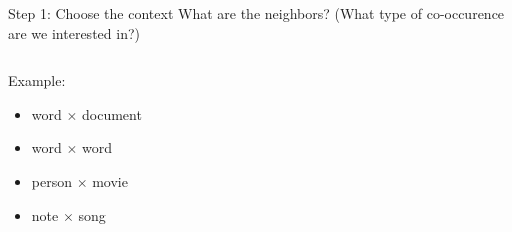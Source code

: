 \documentclass[usenames,dvipsnames,notes,11pt,aspectratio=169]{beamer}
\newcommand{\pdfnote}[1]{}
\begin{document}
\begin{frame}
    {Step 1: Choose the context}
    What are the neighbors? (What type of co-occurence are we interested in?)
    \medskip

    \begin{columns}
        \begin{column}{0.3\textwidth}
    Example:\\
    \begin{itemize}[<+->]
        \item word $\times$ document
        \item word $\times$ word
        \item person $\times$ movie
        \item note $\times$ song
    \end{itemize}
        \end{column}
        \begin{column}{0.65\textwidth}
        \end{column}
    \end{columns}

    \medskip

    \pdfnote{
        In the previous examples we see that the co-occurence of two words carries interesting information.
        But this is not restricted to words.
    }
\end{frame}
\end{document}
